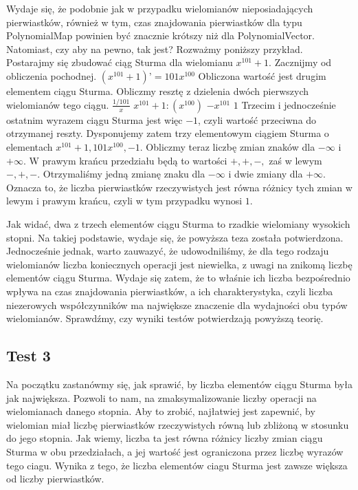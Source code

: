 \documentclass[oneside,a4paper]{book}
\begin{document}
	Wydaje się, że podobnie jak w przypadku wielomianów nieposiadających pierwiastków, również w tym, czas znajdowania pierwiastków dla typu PolynomialMap powinien być znacznie krótszy niż dla PolynomialVector. Natomiast, czy aby na pewno, tak jest? Rozważmy poniższy przykład.
	Postarajmy się zbudować ciąg Sturma dla wielomianu $x^{101}+1$. Zacznijmy od obliczenia pochodnej.
	$(x^{101}+1)’=101x^{100}$
	Obliczona wartość jest drugim elementem ciągu Sturma. Obliczmy resztę z dzielenia dwóch pierwszych wielomianów tego ciągu.
	$\frac{1/101}x$
	$x^{101}+1 : (x^{100})$
	$-x^{101}$
	$1$
	Trzecim i jednocześnie ostatnim wyrazem ciągu Sturma jest więc $-1$, czyli wartość przeciwna do otrzymanej reszty. Dysponujemy zatem trzy elementowym ciągiem Sturma o elementach ${x^{101}+1, 101x^{100}, -1}$. Obliczmy teraz liczbę zmian znaków dla $-\infty$ i $+\infty$. W prawym krańcu przedziału będą to wartości $+,+,-,$ zaś w lewym $-,+,-.$ Otrzymaliśmy jedną zmianę znaku dla $-\infty$ i dwie zmiany dla $+\infty$. Oznacza to, że liczba pierwiastków rzeczywistych jest równa różnicy tych zmian w lewym i prawym krańcu, czyli w tym przypadku wynosi $1$.
	
	Jak widać, dwa z trzech elementów ciągu Sturma to rzadkie wielomiany wysokich stopni. Na takiej podstawie, wydaje się, że powyższa teza została potwierdzona. Jednocześnie jednak, warto zauwazyć, że udowodniliśmy, że dla tego rodzaju wielomianów liczba koniecznych operacji jest niewielka, z uwagi na znikomą liczbę elementów ciągu Sturma. Wydaje się zatem, że to właśnie ich liczba bezpośrednio wpływa na czas znajdowania pierwiastków, a ich charakterystyka, czyli liczba niezerowych współczynników ma największe znaczenie dla wydajności obu typów wielomianów. Sprawdźmy, czy wyniki testów potwierdzają powyższą teorię.
	
	\subsection{Test 3}
	
	Na początku zastanówmy się, jak sprawić, by liczba elementów ciągu Sturma była jak największa. Pozwoli to nam, na zmaksymalizowanie liczby operacji na wielomianach danego stopnia. Aby to zrobić, najłatwiej jest zapewnić, by wielomian miał liczbę pierwiastków rzeczywistych równą lub zbliżoną w stosunku do jego stopnia. Jak wiemy, liczba ta jest równa różnicy liczby zmian ciągu Sturma w obu przedziałach, a jej wartość jest ograniczona przez liczbę wyrazów tego ciagu. Wynika z tego, że liczba elementów ciagu Sturma jest zawsze większa od liczby pierwiastków.
	
\end{document}
